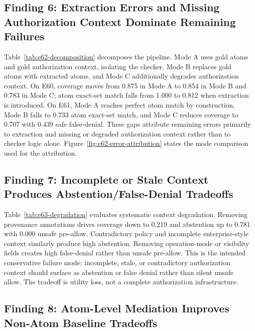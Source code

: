 \subsection{Finding 6: Extraction Errors and Missing Authorization Context Dominate Remaining Failures}




Table~\ref{tab:e62-decomposition} decomposes the pipeline. Mode A uses gold atoms and gold authorization context, isolating the checker. Mode B replaces gold atoms with extracted atoms, and Mode C additionally degrades authorization context. On E60, coverage moves from 0.875 in Mode A to 0.854 in Mode B and 0.783 in Mode C; atom exact-set match falls from 1.000 to 0.812 when extraction is introduced. On E61, Mode A reaches perfect atom match by construction, Mode B falls to 0.733 atom exact-set match, and Mode C reduces coverage to 0.707 with 0.439 safe false-denial. These gaps attribute remaining errors primarily to extraction and missing or degraded authorization context rather than to checker logic alone.
Figure~\ref{fig:e62-error-attribution} states the mode comparison used for the attribution.

\subsection{Finding 7: Incomplete or Stale Context Produces Abstention/False-Denial Tradeoffs}



Table~\ref{tab:e63-degradation} evaluates systematic context degradation. Removing provenance annotations drives coverage down to 0.219 and abstention up to 0.781 with 0.000 unsafe pre-allow. Contradictory policy and incomplete enterprise-style context similarly produce high abstention. Removing operation-mode or visibility fields creates high false-denial rather than unsafe pre-allow. This is the intended conservative failure mode: incomplete, stale, or contradictory authorization context should surface as abstention or false denial rather than silent unsafe allow. The tradeoff is utility loss, not a complete authorization infrastructure.

\subsection{Finding 8: Atom-Level Mediation Improves Non-Atom Baseline Tradeoffs}

